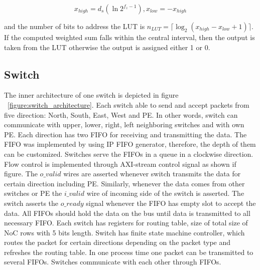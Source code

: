 \begin{equation}
x_{high}=d_{s}(\ln{2^{f_{z}-1}}), x_{low}=-x_{high}
\label{equation:interval}
\end{equation}

and the number of bits to address the LUT is 
$n_{LUT}=\lceil\log_{2}{(x_{high}-x_{low}+1)}\rceil$.
If the computed weighted sum falls within the central interval, then the output is taken from the LUT otherwise the output is assigned either 1 or 0. 

\subsection{Switch}
The inner architecture of one switch is depicted in figure ~\ref{figure:switch_architecture}. Each switch able to send and accept packets from five direction: North, South, East, West and PE. In other words, switch can communicate with upper, lower, right, left neighboring switches and with own PE. Each direction has two FIFO for receiving and transmitting the data. The FIFO was implemented by using IP FIFO generator, therefore, the depth of them can be customized. Switches serve the FIFOs in a queue in a clockwise direction.  Flow control is implemented through AXI-stream control signal as shown if figure.  The $o\_valid$ wires are asserted whenever switch transmits the data for certain direction including PE. Similarly, whenever the data comes from other switches or PE the $i\_valid$ wire of incoming side of the switch is asserted. The switch asserts the $o\_ready$ signal whenever the FIFO has empty slot to accept the data. All FIFOs should hold the data on the bus until data is transmitted to all necessary FIFO. Each switch has registers for routing table, size of total size of NoC rows with 5 bits length. Switch has finite state machine controller, which routes the packet for certain directions depending on the packet type and refreshes the routing table. In one process time one packet can be transmitted to several FIFOs. Switches communicate with each other through FIFOs.  

